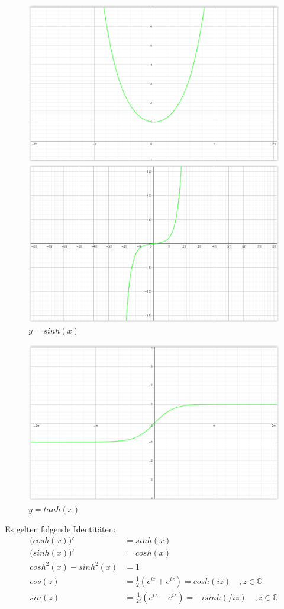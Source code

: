 \documentclass[12pt,a4paper]{report}%
\numberwithin{equation}{section}
\newcommand{\C}{\mathbb{C}}
\numberwithin{equation}{subsection}
\begin{document}
		\vspace{-0.7cm}  	  
	  \begin{figure}[H] 
		\centering
		\begin{minipage}{.5\textwidth}
		  \centering
		  \includegraphics[width=0.8\linewidth]{funktionen_cosh.png}
		  \caption{$y = cosh(x)$}
		  \label{fig:funkt_cosh}
		\end{minipage}%
		\begin{minipage}{.5\textwidth}
		  \centering
		  \includegraphics[width=0.8\linewidth]{funktionen_sinh.png}
		  \caption{$y = sinh(x)$}
		  \label{fig:funkt_sinh}
		\end{minipage}
		\end{figure}
		\vspace{-0.5cm}
		\begin{figure}[H]
		  \centering
		  \includegraphics[width=0.4\linewidth]{funktionen_tanh.png}
		  \caption{$y = tanh(x)$}
		  \label{fig:funkt_tanh}
		\end{figure}
		Es gelten folgende Identitäten:
		\begin{align}
		  \big(cosh(x)\big)' &= sinh(x) \\
		  \big(sinh(x)\big)' &= cosh(x) \\
		  cosh^2(x) - sinh^2(x) &= 1 \\
		  cos(z) &= \frac{1}{2}\left(e^{iz}+e^{iz}\right) = cosh(iz) \quad , z \in \C \\
		  sin(z) &= \frac{1}{2i}\left( e^{iz} - e^{iz}\right) = -isinh(/iz) \quad , z \in \C
		\end{align}
\newpage
\end{document}
